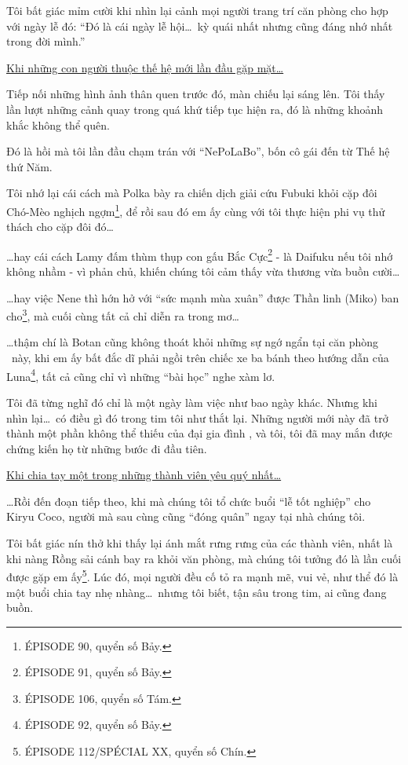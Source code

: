 \documentclass[../main.tex]{subfiles}
\begin{document}
Tôi bất giác mỉm cười khi nhìn lại cảnh mọi người trang trí căn phòng cho hợp với ngày lễ đó: ``Đó là cái ngày lễ hội\dots\ kỳ quái nhất nhưng cũng đáng nhớ nhất trong đời mình.''

\begin{center}
    \uline{Khi những con người thuộc thế hệ mới lần đầu gặp mặt\dots}
\end{center}

Tiếp nối những hình ảnh thân quen trước đó, màn chiếu lại sáng lên. Tôi thấy lần lượt những cảnh quay trong quá khứ tiếp tục hiện ra, đó là những khoảnh khắc không thể quên.

Đó là hồi mà tôi lần đầu chạm trán với ``NePoLaBo'', bốn cô gái đến từ Thế hệ thứ Năm.

Tôi nhớ lại cái cách mà Polka bày ra chiến dịch giải cứu Fubuki khỏi cặp đôi Chó-Mèo nghịch ngợm\footnote{{\flaregothic ÉPISODE 90}, quyển số Bảy.}, để rồi sau đó em ấy cùng với tôi thực hiện phi vụ thử thách cho cặp đôi đó\dots

\dots hay cái cách Lamy đấm thùm thụp con gấu Bắc Cực\footnote{{\flaregothic ÉPISODE 91}, quyển số Bảy.} - là Daifuku nếu tôi nhớ không nhầm - vì phản chủ, khiến chúng tôi cảm thấy vừa thương vừa buồn cười\dots

\dots hay việc Nene thì hớn hở với ``sức mạnh mùa xuân'' được Thần linh (Miko) ban cho\footnote{{\flaregothic ÉPISODE 106}, quyển số Tám.}, mà cuối cùng tất cả chỉ diễn ra trong mơ\dots

\dots thậm chí là Botan cũng không thoát khỏi những sự ngớ ngẩn tại căn phòng \hll\ này, khi em ấy bất đắc dĩ phải ngồi trên chiếc xe ba bánh theo hướng dẫn của Luna\footnote{{\flaregothic ÉPISODE 92}, quyển số Bảy.}, tất cả cũng chỉ vì những ``bài học'' nghe xàm lơ.

Tôi đã từng nghĩ đó chỉ là một ngày làm việc như bao ngày khác. Nhưng khi nhìn lại\dots\ có điều gì đó trong tim tôi như thắt lại. Những người mới này đã trở thành một phần không thể thiếu của đại gia đình \hll, và tôi, tôi đã may mắn được chứng kiến họ từ những bước đi đầu tiên.

\begin{center}
    \uline{Khi chia tay một trong những thành viên yêu quý nhất\dots}
\end{center}

\dots Rồi đến đoạn tiếp theo, khi mà chúng tôi tổ chức buổi ``lễ tốt nghiệp'' cho Kiryu Coco, người mà sau cùng cũng ``đóng quân'' ngay tại nhà chúng tôi.

Tôi bất giác nín thở khi thấy lại ánh mắt rưng rưng của các thành viên, nhất là khi nàng Rồng sải cánh bay ra khỏi văn phòng, mà chúng tôi tưởng đó là lần cuối được gặp em ấy\footnote{{\flaregothic ÉPISODE 112/SPÉCIAL {\ab XX}}, quyển số Chín.}. Lúc đó, mọi người đều cố tỏ ra mạnh mẽ, vui vẻ, như thể đó là một buổi chia tay nhẹ nhàng\dots\ nhưng tôi biết, tận sâu trong tim, ai cũng đang buồn.
\end{document}
